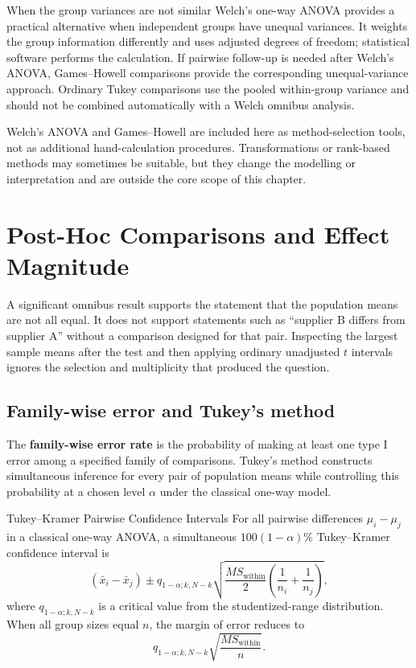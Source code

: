 \begin{custombox}{When the group variances are not similar}
Welch's one-way ANOVA provides a practical alternative when independent groups have unequal variances. It weights the group information differently and uses adjusted degrees of freedom; statistical software performs the calculation. If pairwise follow-up is needed after Welch's ANOVA, Games--Howell comparisons provide the corresponding unequal-variance approach. Ordinary Tukey comparisons use the pooled within-group variance and should not be combined automatically with a Welch omnibus analysis.
\end{custombox}

Welch's ANOVA and Games--Howell are included here as method-selection tools, not as additional hand-calculation procedures. Transformations or rank-based methods may sometimes be suitable, but they change the modelling or interpretation and are outside the core scope of this chapter.

\section{Post-Hoc Comparisons and Effect Magnitude}
\label{sec:anova-posthoc-effect}

A significant omnibus result supports the statement that the population means are not all equal. It does not support statements such as ``supplier B differs from supplier A'' without a comparison designed for that pair. Inspecting the largest sample means after the test and then applying ordinary unadjusted $t$ intervals ignores the selection and multiplicity that produced the question.

\subsection{Family-wise error and Tukey's method}

The \textbf{family-wise error rate} is the probability of making at least one type I error among a specified family of comparisons. Tukey's method constructs simultaneous inference for every pair of population means while controlling this probability at a chosen level $\alpha$ under the classical one-way model.

\begin{theorem}{Tukey--Kramer Pairwise Confidence Intervals}
For all pairwise differences $\mu_i-\mu_j$ in a classical one-way ANOVA, a simultaneous $100(1-\alpha)\%$ Tukey--Kramer confidence interval is
\[
(\bar x_i-\bar x_j)
\pm
q_{1-\alpha;k,N-k}
\sqrt{
\frac{MS_{\text{within}}}{2}
\left(\frac{1}{n_i}+\frac{1}{n_j}\right)
},
\]
where $q_{1-\alpha;k,N-k}$ is a critical value from the studentized-range distribution. When all group sizes equal $n$, the margin of error reduces to
\[
q_{1-\alpha;k,N-k}
\sqrt{\frac{MS_{\text{within}}}{n}}.
\]
\end{theorem}

